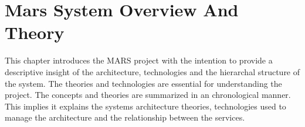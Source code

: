 \newpage
\chapter{Mars System Overview And Theory}

This chapter introduces the MARS project with the intention to provide a descriptive insight
of the architecture, technologies and the hierarchal structure of the system. The theories and
technologies are essential for understanding the project. The concepts and theories are summarized
in an chronological manner. This implies it explains the systems architecture theories,
technologies used to manage the architecture and the relationship between the services\cite{SOA}.

	
